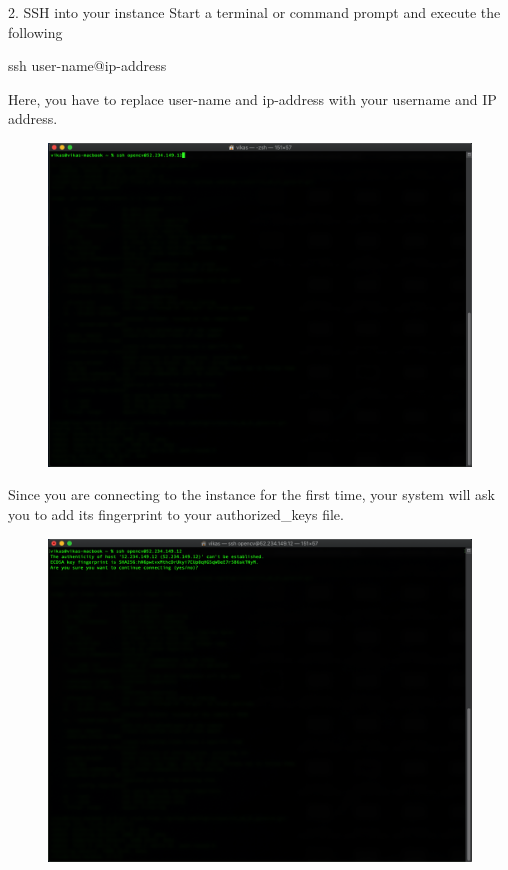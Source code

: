 2. SSH into your instance
Start a terminal or command prompt and execute the following

ssh user-name@ip-address

Here, you have to replace user-name and ip-address with your username and IP address.

\begin{figure}[H]
\begin{center} 
\includegraphics[scale=0.30]{figures/ssh3}
\end{center}
\end{figure}

Since you are connecting to the instance for the first time, your system will ask you to add its fingerprint to your authorized\_keys file. 

\begin{figure}[H]
\begin{center} 
\includegraphics[scale=0.30]{figures/ssh4}
\end{center}
\end{figure}

